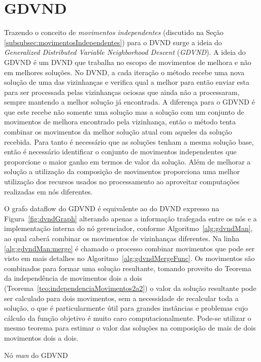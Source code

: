 \section{GDVND}\label{subsec:gdvnd}

Trazendo o conceito de \textit{movimentos independentes} (discutido na Seção \ref{subsubsec:movimentosIndependentes}) para o DVND surge a ideia do \emph{Generalized Distributed Variable Neighborhood Descent} (\emph{GDVND}).
A ideia do GDVND é um DVND que trabalha no escopo de movimentos de melhora e não em melhores soluções.
No DVND, a cada iteração o método recebe uma nova solução de uma das vizinhanças e verifica qual a melhor para então enviar esta para ser processada pelas vizinhanças ociosas que ainda não a processaram, sempre mantendo a melhor solução já encontrada.
A diferença para o GDVND é que este recebe não somente uma solução mas a solução com um conjunto de movimentos de melhora encontrado pela vizinhança, então o método tenta combinar os movimentos da melhor solução atual com aqueles da solução recebida.
Para tanto é necessário que as soluções tenham a mesma solução base, então é necessário identificar o conjunto de movimentos independentes que proporcione o maior ganho em termos de valor da solução.
Além de melhorar a solução a utilização da composição de movimentos proporciona uma melhor utilização dos recursos usados no processamento ao aproveitar computações realizadas em nós diferentes.

O grafo dataflow do GDVND é equivalente ao do DVND expresso na Figura~\ref{fig:dvndGraph} alterando apenas a informação trafegada entre os nós e a implementação interna do nó gerenciador, conforme Algoritmo~\ref{alg:gdvndMan}, ao qual caberá combinar os movimentos de vizinhanças diferentes.
Na linha \ref{alg:gdvndMan:merge} é chamado o processo combinar movimentos que pode ser visto em mais detalhes no Algoritmo~\ref{alg:gdvndMergeFunc}.
Os movimentos são combinados para formar uma solução resultante, tomando proveito do Teorema da independência de movimentos dois a dois (Teorema~\ref{teo:independenciaMovimentos2a2}) o valor da solução resultante pode ser calculado para dois movimentos, sem a necessidade de recalcular toda a solução, o que é particularmente útil para grandes instâncias e problemas cujo cálculo da função objetivo é muito caro computacionalmente.
Pode-se utilizar o mesmo teorema para estimar o valor das soluções na composição de mais de dois movimentos dois a dois.

\begin{algorithm}[htpb]
\caption{Nó \textit{man} do GDVND}
\label{alg:gdvndMan}
\begin{algorithmic}[1]
         \label{alg:gdvndMan:merge} 
         
    \EndFunction
\end{algorithmic}
\end{algorithm}

